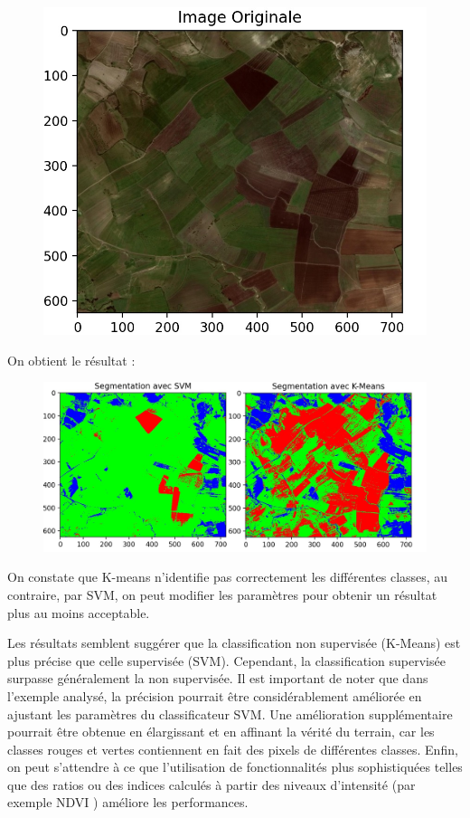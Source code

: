 \documentclass[12pt, openany]{report}
\begin{document}
\begin{figure}[H]
\centering
\includegraphics[scale=0.3]{original_assilah.jpg}
\end{figure}

On obtient le résultat : 


\begin{figure}[H]
\centering
\includegraphics[scale=0.47]{kmeans_svm.jpg}
\end{figure}

On constate que K-means n'identifie pas correctement les différentes classes, au contraire, par SVM, on peut modifier les paramètres pour obtenir un résultat plus au moins acceptable.

Les résultats semblent suggérer que la classification non supervisée (K-Means) est plus précise que celle supervisée (SVM). Cependant, la classification supervisée surpasse généralement la non supervisée. Il est important de noter que dans l'exemple analysé, la précision pourrait être considérablement améliorée en ajustant les paramètres du classificateur SVM. Une amélioration supplémentaire pourrait être obtenue en élargissant et en affinant la vérité du terrain, car les classes rouges et vertes contiennent en fait des pixels de différentes classes. Enfin, on peut s'attendre à ce que l'utilisation de fonctionnalités plus sophistiquées telles que des ratios ou des indices calculés à partir des niveaux d'intensité (par exemple NDVI ) améliore les performances.
\end{document}
